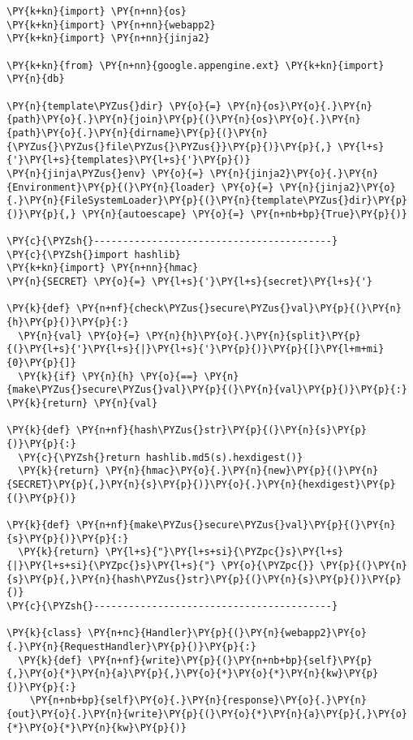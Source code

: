 \begin{Verbatim}[commandchars=\\\{\}]
\PY{k+kn}{import} \PY{n+nn}{os}
\PY{k+kn}{import} \PY{n+nn}{webapp2}
\PY{k+kn}{import} \PY{n+nn}{jinja2}

\PY{k+kn}{from} \PY{n+nn}{google.appengine.ext} \PY{k+kn}{import} \PY{n}{db}

\PY{n}{template\PYZus{}dir} \PY{o}{=} \PY{n}{os}\PY{o}{.}\PY{n}{path}\PY{o}{.}\PY{n}{join}\PY{p}{(}\PY{n}{os}\PY{o}{.}\PY{n}{path}\PY{o}{.}\PY{n}{dirname}\PY{p}{(}\PY{n}{\PYZus{}\PYZus{}file\PYZus{}\PYZus{}}\PY{p}{)}\PY{p}{,} \PY{l+s}{'}\PY{l+s}{templates}\PY{l+s}{'}\PY{p}{)}
\PY{n}{jinja\PYZus{}env} \PY{o}{=} \PY{n}{jinja2}\PY{o}{.}\PY{n}{Environment}\PY{p}{(}\PY{n}{loader} \PY{o}{=} \PY{n}{jinja2}\PY{o}{.}\PY{n}{FileSystemLoader}\PY{p}{(}\PY{n}{template\PYZus{}dir}\PY{p}{)}\PY{p}{,} \PY{n}{autoescape} \PY{o}{=} \PY{n+nb+bp}{True}\PY{p}{)}

\PY{c}{\PYZsh{}-----------------------------------------}
\PY{c}{\PYZsh{}import hashlib}
\PY{k+kn}{import} \PY{n+nn}{hmac}
\PY{n}{SECRET} \PY{o}{=} \PY{l+s}{'}\PY{l+s}{secret}\PY{l+s}{'}

\PY{k}{def} \PY{n+nf}{check\PYZus{}secure\PYZus{}val}\PY{p}{(}\PY{n}{h}\PY{p}{)}\PY{p}{:}
  \PY{n}{val} \PY{o}{=} \PY{n}{h}\PY{o}{.}\PY{n}{split}\PY{p}{(}\PY{l+s}{'}\PY{l+s}{|}\PY{l+s}{'}\PY{p}{)}\PY{p}{[}\PY{l+m+mi}{0}\PY{p}{]}
  \PY{k}{if} \PY{n}{h} \PY{o}{==} \PY{n}{make\PYZus{}secure\PYZus{}val}\PY{p}{(}\PY{n}{val}\PY{p}{)}\PY{p}{:} \PY{k}{return} \PY{n}{val}

\PY{k}{def} \PY{n+nf}{hash\PYZus{}str}\PY{p}{(}\PY{n}{s}\PY{p}{)}\PY{p}{:}
  \PY{c}{\PYZsh{}return hashlib.md5(s).hexdigest()}
  \PY{k}{return} \PY{n}{hmac}\PY{o}{.}\PY{n}{new}\PY{p}{(}\PY{n}{SECRET}\PY{p}{,}\PY{n}{s}\PY{p}{)}\PY{o}{.}\PY{n}{hexdigest}\PY{p}{(}\PY{p}{)}

\PY{k}{def} \PY{n+nf}{make\PYZus{}secure\PYZus{}val}\PY{p}{(}\PY{n}{s}\PY{p}{)}\PY{p}{:}
  \PY{k}{return} \PY{l+s}{"}\PY{l+s+si}{\PYZpc{}s}\PY{l+s}{|}\PY{l+s+si}{\PYZpc{}s}\PY{l+s}{"} \PY{o}{\PYZpc{}} \PY{p}{(}\PY{n}{s}\PY{p}{,}\PY{n}{hash\PYZus{}str}\PY{p}{(}\PY{n}{s}\PY{p}{)}\PY{p}{)}
\PY{c}{\PYZsh{}-----------------------------------------}

\PY{k}{class} \PY{n+nc}{Handler}\PY{p}{(}\PY{n}{webapp2}\PY{o}{.}\PY{n}{RequestHandler}\PY{p}{)}\PY{p}{:}
  \PY{k}{def} \PY{n+nf}{write}\PY{p}{(}\PY{n+nb+bp}{self}\PY{p}{,}\PY{o}{*}\PY{n}{a}\PY{p}{,}\PY{o}{*}\PY{o}{*}\PY{n}{kw}\PY{p}{)}\PY{p}{:}
    \PY{n+nb+bp}{self}\PY{o}{.}\PY{n}{response}\PY{o}{.}\PY{n}{out}\PY{o}{.}\PY{n}{write}\PY{p}{(}\PY{o}{*}\PY{n}{a}\PY{p}{,}\PY{o}{*}\PY{o}{*}\PY{n}{kw}\PY{p}{)}


\end{Verbatim}

